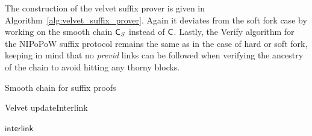 The construction of the velvet suffix prover is given in Algorithm~\ref{alg:velvet_suffix_prover}. Again it deviates from the soft fork case by working on the smooth chain $\mathsf{C}_S$ instead of $\mathsf{C}$.
Lastly, the Verify algorithm for the NIPoPoW suffix protocol remains the same as in the case of hard or soft fork, keeping in mind that no \emph{previd} links can be followed when verifying the ancestry of the chain to avoid hitting any thorny blocks.

\begin{algorithm}[h]
	\caption{\label{alg:smooth_chain_suffix}Smooth chain for suffix proofs}
	\begin{algorithmic}[1]
						\EndIf
				\EndWhile
				\State{}
			\EndFunction

					\State\Return{$\true$}
				\EndIf
							\State\Return{$\false$}
						\EndIf
				\EndFor
				\State\Return{$\true$}
			\EndFunction

							\State\Return{$\false$}
						\EndIf
							\State\Return{$\false$}
						\EndIf
				\EndWhile
				\State{}
			\EndFunction
	\end{algorithmic}
\end{algorithm}

\begin{algorithm}[h]
		\caption{\label{alg:update_interlink}Velvet updateInterlink}
		\begin{algorithmic}[1]
						\EndFor
						\State\Return$\textsf{interlink}$
				\EndFunction
		\end{algorithmic}
\end{algorithm}

